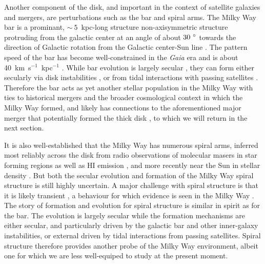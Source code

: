 Another component of the disk, and important in the context of satellite galaxies and mergers, are perturbations such as the bar and spiral arms. The Milky Way bar is a prominant, $\sim~5$~kpc-long structure non-axisymmetric structure protruding from the galactic center at an angle of about $30~\hbox{$^\circ$}$ towards the direction of Galactic rotation from the Galactic center-Sun line \parencite{wegg15}. The pattern speed of the bar has become well-constrained in the \textit{Gaia} era and is about 40~km~s$^{-1}$~kpc$^{-1}$ \parencite[e.g.][]{bovy19,sanders19}. While bar evolution is largely secular \parencite{athanassoula03}, they can form either secularly via disk instabilities \parencite{ostriker73}, or from tidal interactions with passing satellites \parencite{noguchi87}. Therefore the bar acts as yet another stellar population in the Milky Way with ties to historical mergers and the broader cosmological context in which the Milky Way formed, and likely has connections to the aforementioned major merger that potentially formed the thick disk \parencite{fragkoudi20,merrow23}, to which we will return in the next section.

It is also well-established that the Milky Way has numerous spiral arms, inferred most reliably across the disk from radio observations of molecular masers in star forming regions as well as HI emission \parencite{levine06,reid14,reid19}, and more recently near the Sun in stellar density \parencite{eilers19}. But both the secular evolution and formation of the Milky Way spiral structure is still highly uncertain. A major challenge with spiral structure is that it is likely transient \parencite[][reviews secular disk evolution, including the transient spiral structure]{sellwood14}, a behaviour for which evidence is seen in the Milky Way \parencite{hunt18,sellwood19}. The story of formation and evolution for spiral structure is similar in spirit as for the bar. The evolution is largely secular while the formation mechanisms are either secular, and particularly driven by the galactic bar and other inner-galaxy instabilities, or external driven by tidal interactions from passing satellites. Spiral structure therefore provides another probe of the Milky Way environment, albeit one for which we are less well-equiped to study at the present moment.

